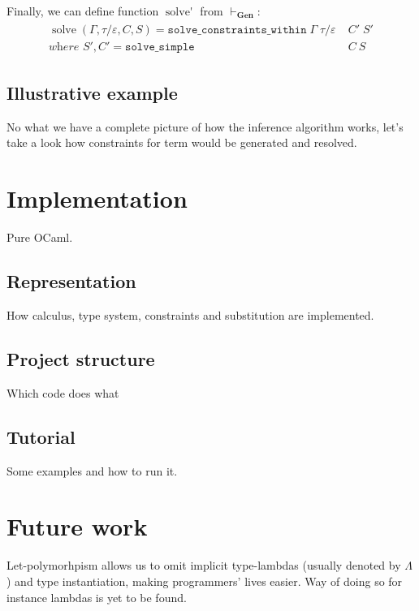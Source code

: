 \documentclass[declaration,shortabstract]{iithesis}
\begin{document}
Finally, we can define function $\operatorname{solve'}$ from $ \vdash_\textbf{Gen} $:
\begin{gather*}\begin{aligned}
\operatorname{solve}(\Gamma, \tau/\varepsilon, C, S) = 
    \texttt{solve\_constraints\_within}\;\Gamma\;\tau / \varepsilon\;& C'\;S' \\
    \textit{where } S', C' = \texttt{solve\_simple}\;& C\:S 
\end{aligned}
\end{gather*}

\section{Illustrative example}
No what we have a complete picture of how the inference algorithm works, let's take a look how constraints for term would be generated and resolved.

\chapter{Implementation}
Pure OCaml.

\section{Representation}
How calculus, type system, constraints and substitution are implemented.

\section{Project structure}
Which code does what

\section{Tutorial}
Some examples and how to run it.

\chapter{Future work}
Let-polymorhpism allows us to omit implicit type-lambdas
(usually denoted by $\Lambda$) and type instantiation, making programmers'
lives easier.
Way of doing so for instance lambdas is yet to be found.
\end{document}
